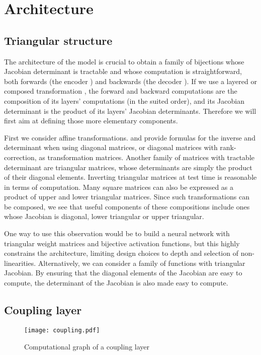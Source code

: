 \documentclass{article}
\begin{document}
\section{Architecture}
\subsection{Triangular structure}
The architecture of the model is crucial to obtain
a family of bijections whose Jacobian determinant is tractable and whose computation
is straightforward, both forwards (the encoder ) and backwards (the decoder ).
If we use a layered or composed transformation , the
forward and backward computations are the composition of its layers' computations (in the suited order),
and its Jacobian determinant
is the product of
its layers' Jacobian determinants. Therefore we will first aim at
defining those more elementary components.

First we consider affine transformations.
\citep{Rezende-et-al-arxiv2014} and \citep{Kingma+Welling-ICLR2014} provide
formulas for the inverse and determinant when using diagonal matrices, or diagonal
matrices with rank- correction, as transformation matrices. Another
family of matrices with tractable determinant are triangular
matrices, whose determinants are simply the product of their
diagonal elements. Inverting triangular matrices at test time is 
reasonable in terms of computation. Many square matrices  can also be expressed as a product  of upper
and lower triangular matrices. Since such transformations can be composed,
we see that useful components of these compositions include ones whose
Jacobian is diagonal, lower triangular or upper triangular.


One way to use this observation would be to build a neural network with triangular 
weight matrices and bijective activation functions, but this highly constrains
the architecture, limiting design choices to depth and selection of non-linearities.
Alternatively, we can consider a family of functions with triangular
Jacobian. By ensuring that the diagonal elements of the Jacobian are easy to compute,
the determinant of the Jacobian is also made easy to compute.

\subsection{Coupling layer}
\begin{figure}
    \centering \texttt{[image: coupling.pdf]}
    \caption{Computational graph of a coupling layer}
    \label{fig:coupling}
\end{figure}
\end{document}
